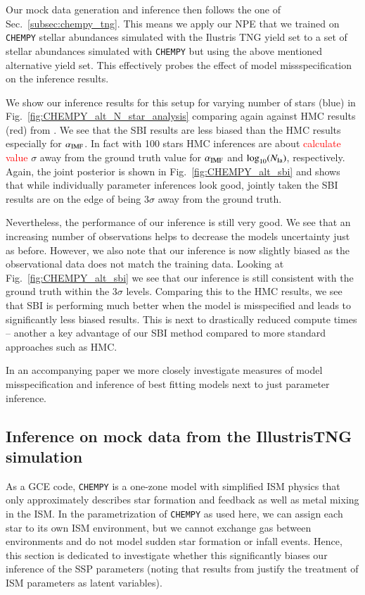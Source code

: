 \documentclass{aa}
\begin{document}
Our mock data generation and inference then follows the one of Sec.~\ref{subsec:chempy_tng}. This means we apply our NPE that we trained on \texttt{CHEMPY} stellar abundances simulated with the Ilustris TNG yield set to a set of stellar abundances simulated with \texttt{CHEMPY} but using the above mentioned alternative yield set. This effectively probes the effect of model missspecification on the inference results.

We show our inference results for this setup for varying number of stars (blue) in Fig.~\ref{fig:CHEMPY_alt_N_star_analysis} comparing again against HMC results (red) from \citet{Philcox_2019}. We see that the SBI results are less biased than the HMC results especially for $\alpha_{\rm IMF}$. In fact with 100 stars HMC inferences are about \textcolor{red}{calculate value} $\sigma$ away from the ground truth value for $\alpha_{\rm IMF}$ and $\log_{10}(N_{\rm Ia})$, respectively. Again, the joint posterior is shown in Fig.~\ref{fig:CHEMPY_alt_sbi} and shows that while individually parameter inferences look good, jointly taken the SBI results are on the edge of being $3\sigma$ away from the ground truth.

Nevertheless, the performance of our inference is still very good. We see that an increasing number of observations helps to decrease the models uncertainty just as before. However, we also note that our inference is now slightly biased as the observational data does not match the training data. Looking at Fig.~\ref{fig:CHEMPY_alt_sbi} we see that our inference is still consistent with the ground truth within the $3\sigma$ levels. Comparing this to the HMC results, we see that SBI is performing much better when the model is misspecified and leads to significantly less biased results. This is next to drastically reduced compute times -- another a key advantage of our SBI method compared to more standard approaches such as HMC.

In an accompanying paper we more closely investigate measures of model misspecification and inference of best fitting models next to just parameter inference.  

\subsection{Inference on mock data from the IllustrisTNG simulation}
\label{subsec:tng_sim}

As a GCE code, \texttt{CHEMPY} is a one-zone model with simplified ISM physics that only approximately describes star formation and feedback as well as metal mixing in the ISM.
In the parametrization of \texttt{CHEMPY} as used here, we can assign each star to its own ISM environment, but we cannot exchange gas between environments and do not model sudden star formation or infall events. Hence, this section is dedicated to investigate whether this significantly biases our inference of the SSP parameters (noting that results from \citet{2019ApJ...874..102W} justify the treatment of ISM parameters as latent variables).
\end{document}
